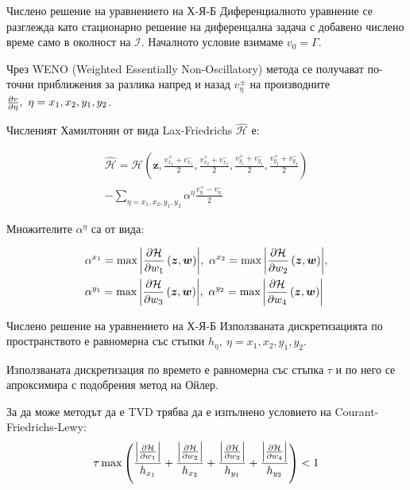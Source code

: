 \begin{frame}[t]{Числено решение на уравнението на Х-Я-Б}
  \vspace{-1em}
  Диференциалното уравнение се разглежда като стационарно решение на диференцална задача с добавено числено време само в околност на $\mathscr{I}$.
  Началното условие взимаме $v_0 = \Gamma$.

  Чрез WENO (Weighted Essentially Non-Oscillatory) метода се получават по-точни приближения за разлика напред и назад $v_{\eta}^{\pm}$ на производните $\pdv{v}{\eta},~ \eta = x_1, x_2, y_1, y_2$.

  Численият Хамилтонян от вида Lax-Friedrichs $\hat{\mathcal{H}}$ е:
  \begin{small}
    \begin{multline}
      \hat{\mathcal{H}} = \mathcal{H}\left(\boldsymbol{z}, \frac{v_{x_1}^++v_{x_1}^-}{2}, \frac{v_{x_2}^++v_{x_2}^-}{2}, \frac{v_{y_1}^++v_{y_1}^-}{2}, \frac{v_{y_2}^++v_{y_2}^-}{2}\right) \\ - \sum_{\eta = x_1, x_2, y_1, y_2} \alpha^{\eta} \frac{v_{\eta}^+-v_{\eta}^-}{2}
    \end{multline}
  \end{small}
  Множителите $\alpha^{\eta}$ са от вида:
  \begin{small}
    \begin{equation}
      \begin{split}
        &\alpha^{x_1} = \max \abs{\pdv{\mathcal{H}}{w_1}\left(\boldsymbol{z}, \boldsymbol{w}\right)},~
        \alpha^{x_2} = \max \abs{\pdv{\mathcal{H}}{w_2}\left(\boldsymbol{z}, \boldsymbol{w}\right)}, \\
        &\alpha^{y_1} = \max \abs{\pdv{\mathcal{H}}{w_3}\left(\boldsymbol{z}, \boldsymbol{w}\right)},~
        \alpha^{y_2} = \max \abs{\pdv{\mathcal{H}}{w_4}\left(\boldsymbol{z}, \boldsymbol{w}\right)}
      \end{split}
    \end{equation}
  \end{small}
\end{frame}

\begin{frame}[t]{Числено решение на уравнението на Х-Я-Б}
  Използваната дискретизацията по пространството е равномерна със стъпки $h_\eta,~ \eta = x_1, x_2, y_1, y_2$.

  Използваната дискретизация по времето е равномерна със стъпка $\tau$ и по него се апроксимира с подобрения метод на Ойлер.

  За да може методът да е TVD трябва да е изпълнено условието на Courant-Friedrichs-Lewy:
  \begin{equation}
    \tau \max \left(\frac{\abs{\pdv{\mathcal{H}}{w_1}}}{h_{x_1}} + \frac{\abs{\pdv{\mathcal{H}}{w_2}}}{h_{x_2}} + \frac{\abs{\pdv{\mathcal{H}}{w_3}}}{h_{y_1}} + \frac{\abs{\pdv{\mathcal{H}}{w_4}}}{h_{y_2}}\right) < 1
  \end{equation}
\end{frame}
